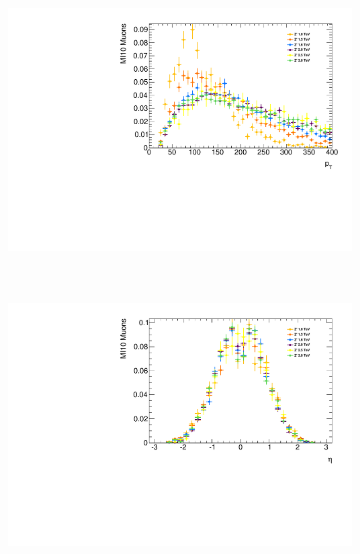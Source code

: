 \begin{figure}[t]
\begin{subfigure}{0.49\linewidth}
\includegraphics[width=\textwidth]{PartBoosted/Plots/h_mi10_pt.pdf}
\end{subfigure}
~
\begin{subfigure}{0.49\linewidth}
\includegraphics[width=\textwidth]{PartBoosted/Plots/h_mi10_eta.pdf}
\end{subfigure}


\end{figure}
